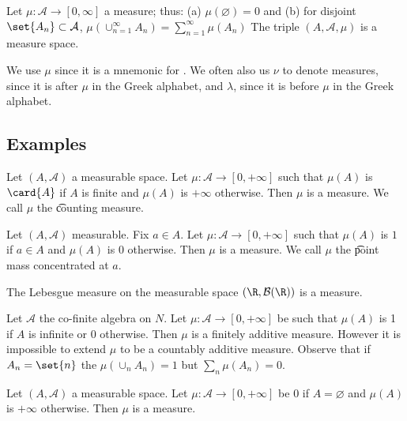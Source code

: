Let $\mu : \mathcal{A}  \to [0, \infty]$ a measure;
thus:
(a) $\mu (\varnothing) = 0$ and
(b) for disjoint $\set{A_n} \subset \mathcal{A} $,
$\mu (\cup_{n = 1}^{\infty} A_n) = \sum_{n = 1}^{\infty} \mu (A_n)$
The triple $(A, \mathcal{A} , \mu )$ is a measure space.

We use $\mu $ since it is a mnemonic for .
We often also us $\nu $ to denote measures, since it is after $\mu $ in the Greek alphabet, and $\lambda $, since it is before $\mu $ in the Greek alphabet.

\subsection*{Examples}

\begin{expl}
Let $(A, \mathcal{A} )$ a measurable space.
Let $\mu : \mathcal{A}  \to [0, +\infty]$ such that $\mu (A)$ is $\card{A}$ if $A$ is finite and $\mu (A)$ is $+\infty$ otherwise.
Then $\mu $ is a measure.
We call $\mu $ the \t{counting measure}.
\end{expl}

\begin{expl}
Let $(A, \mathcal{A} )$ measurable.
Fix $a \in A$.
Let $\mu : \mathcal{A}  \to [0, +\infty]$ such that $\mu (A)$ is $1$ if $a \in A$ and $\mu (A)$ is $0$ otherwise.
Then $\mu $ is a measure.
We call $\mu $ the \t{point mass} concentrated at $a$.
\end{expl}

\begin{expl}
The Lebesgue measure on the measurable space $(\R , \mathcal{B} (\R ))$ is a measure.
\end{expl}

\begin{expl}
Let $\mathcal{A} $ the co-finite algebra on $N$.
Let $\mu : \mathcal{A}  \to [0, +\infty]$ be such that $\mu (A)$ is 1 if $A$ is infinite or 0 otherwise.
Then $\mu $ is a finitely additive measure.
However it is impossible to extend $\mu $ to be a countably additive measure.
Observe that if $A_n = \set{n}$ the $\mu (\cup_{n} A_n) = 1$ but $\sum_{n} \mu (A_n) = 0$.
\end{expl}

\begin{expl}
Let $(A, \mathcal{A} )$ a measurable space.
Let $\mu : \mathcal{A}  \to [0, +\infty]$ be $0$ if $A = \varnothing$ and $\mu (A)$ is $+\infty$ otherwise.
Then $\mu $ is a measure.
\end{expl}

